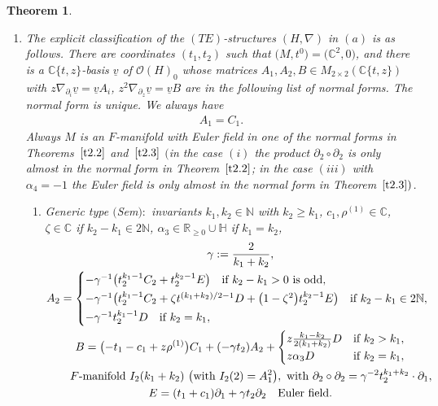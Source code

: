 \documentclass[pdftex]{sigma}%
\numberwithin{equation}{section}
\numberwithin{figure}{section}
\newcommand{\N}{{\mathbb N}}
\newcommand{\C}{{\mathbb C}}
\newcommand{\R}{{\mathbb R}}
\renewcommand{\H}{{\mathbb H}}
\newcommand{\OO}{{\mathcal O}}
\newcommand{\uuuu}{\underline}
\newcommand{\paa}{\partial}
\newcommand{\nnn}{\nabla}
\newtheorem{Theorem}{Theorem}[section]
\begin{document}
\begin{Theorem}
\begin{enumerate}
\item[$(d)$] The explicit classification of the $(TE)$-structures
$(H,\nnn)$ in $(a)$ is as follows.
There are coordinates $(t_1,t_2)$ such that $\big(M,t^0\big)=\big(\C^2,0\big)$,
and there is a $\C\{t,z\}$-basis $\uuuu{v}$ of $\OO(H)_0$
whose matrices $A_1,A_2,B\in M_{2\times 2}(\C\{t,z\})$ with
$z\nnn_{\paa_i}\uuuu{v}=\uuuu{v}A_i$,
$z^2\nnn_{\paa_z}\uuuu{v}=\uuuu{v}B$ are in the following
list of normal forms. The normal form is unique.
We always have
\begin{gather*}%
A_1=C_1.
\end{gather*}
Always $M$ is an $F$-manifold with Euler field
in one of the normal forms in Theorems~$\ref{t2.2}$
and~$\ref{t2.3}$ $($in the case $(i)$ the product
$\paa_2\circ\paa_2$ is only almost in the normal form
in Theorem~$\ref{t2.2}$;
in the case $(iii)$ with $\alpha_4=-1$
the Euler field is only almost in the normal form
in Theorem~$\ref{t2.3})$.


\begin{enumerate}\itemsep=0pt
\item[$(i)$] Generic type $($Sem$){:}$
invariants $k_1,k_2\in\N$ with $k_2\geq k_1$,
$c_1,\rho^{(1)}\in\C$, $\zeta\in\C$ if $k_2-k_1\in 2\N$,
$\alpha_3\in\R_{\geq 0}\cup\H$ if $k_1=k_2$,
\begin{gather*}%
\gamma := \frac{2}{k_1+k_2},
\\
A_2=\begin{cases} -\gamma^{-1}
\big(t_2^{k_1-1}C_2 + t_2^{k_2-1}E\big)
\quad\text{if}\ k_2-k_1>0\ \text{is odd,}
\\[.5ex]
-\gamma^{-1}\big(t_2^{k_1-1}C_2 +\zeta t^{(k_1+k_2)/2-1}D+\big(1-\zeta^2\big)t_2^{k_2-1}E\big)
\quad \text{if}\ k_2-k_1\in 2\N,\!\!\!
\\[.5ex]
-\gamma^{-1}t_2^{k_1-1}D \quad\text{if}\ k_2=k_1,
\end{cases}
\\
B= \big({-}t_1-c_1+z\rho^{(1)}\big)C_1+(-\gamma t_2)A_2
+\begin{cases}
z\frac{k_1-k_2}{2(k_1+k_2)}D&\text{if}\ k_2>k_1,
\\
z\alpha_3 D&\text{if}\ k_2=k_1,\end{cases}
\\ \hphantom{B= }
\text{$F$-manifold }I_2(k_1+k_2)\ \big(\text{with }I_2(2)=A_1^2\big),\
\text{with}\ \paa_2\circ\paa_2
=\gamma^{-2}t_2^{k_1+k_2}\cdot \paa_1,
\\
E= (t_1+c_1)\paa_1 +\gamma t_2\paa_2\quad\text{Euler field}.
\end{gather*}


\end{enumerate}
\end{enumerate}
\end{Theorem}
\end{document}
